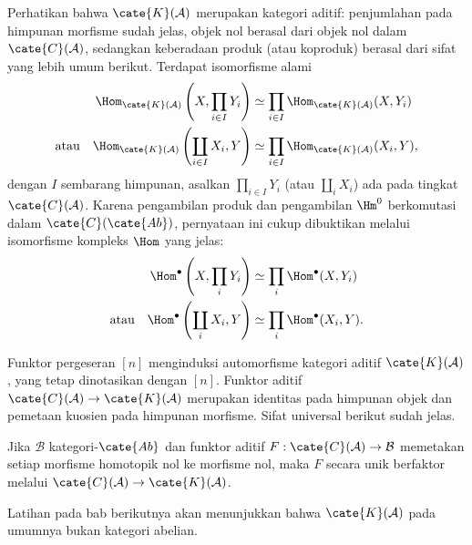 Perhatikan bahwa $\cate{K}(\mathcal{A})$ merupakan kategori aditif:
penjumlahan pada himpunan morfisme sudah jelas, objek nol berasal dari objek
nol dalam $\cate{C}(\mathcal{A})$, sedangkan keberadaan produk (atau
koproduk) berasal dari sifat yang lebih umum berikut. Terdapat isomorfisme
alami
\begin{align*}
	\Hom_{\cate{K}(\mathcal{A})}\left( X, \prod_{i \in I} Y_i \right) & \simeq \prod_{i \in I} \Hom_{\cate{K}(\mathcal{A})}(X, Y_i) \\
	\text{atau}\quad \Hom_{\cate{K}(\mathcal{A})}\left( \coprod_{i \in I} X_i, Y \right) & \simeq \prod_{i \in I} \Hom_{\cate{K}(\mathcal{A})}(X_i, Y),
\end{align*}
	dengan $I$ sembarang himpunan, asalkan $\prod_{i\in I}Y_i$ (atau
$\coprod_iX_i$) ada pada tingkat $\cate{C}(\mathcal{A})$. Karena pengambilan
	produk dan pengambilan $\Hm^0$ berkomutasi dalam $\cate{C}(\cate{Ab})$,
	pernyataan ini cukup dibuktikan melalui isomorfisme kompleks $\Hom$ yang jelas:
\begin{align*}
	\Hom^\bullet\left(X, \prod_i Y_i\right) & \simeq \prod_i \Hom^\bullet(X, Y_i) \\
	\text{atau}\quad \Hom^\bullet\left(\coprod_i X_i, Y\right) & \simeq \prod_i \Hom^\bullet(X_i, Y).
\end{align*}

Funktor pergeseran $[n]$ menginduksi automorfisme kategori aditif
$\cate{K}(\mathcal{A})$, yang tetap dinotasikan dengan $[n]$. Funktor aditif
$\cate{C}(\mathcal{A})\to\cate{K}(\mathcal{A})$ merupakan identitas pada
himpunan objek dan pemetaan kuosien pada himpunan morfisme. Sifat universal
berikut sudah jelas.

\begin{proposisi}\label{prop:homotopy-category-universal-property}
	Jika $\mathcal{B}$ kategori-$\cate{Ab}$ dan funktor aditif
	$F:\cate{C}(\mathcal{A})\to\mathcal{B}$ memetakan setiap morfisme
	homotopik nol ke morfisme nol, maka $F$ secara unik berfaktor melalui
	$\cate{C}(\mathcal{A})\to\cate{K}(\mathcal{A})$.
\end{proposisi}

Latihan pada bab berikutnya akan menunjukkan bahwa $\cate{K}(\mathcal{A})$
pada umumnya bukan kategori abelian.

